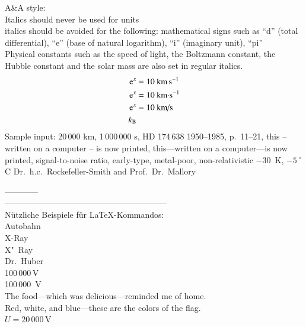A\&A style:\\
Italics should never be used for units\\
italics should be avoided for the following: mathematical signs such as ``d'' (total differential), ``e'' (base of natural logarithm), ``i'' (imaginary unit), ``pi''\\
Physical constants such as the speed of light, the Boltzmann constant, the Hubble constant and the solar mass are also set in regular italics.\\
\begin{align}
	\text{e}^x &= 10~\text{km\,s}^{-1}\\
	\text{e}^x &= 10~\text{km\textperiodcentered s}^{-1}\\
	\text{e}^x &= 10~\text{km/s}\\
	k_\text{B}
\end{align}
Sample input:
20\,000 km, 1\,000\,000 s, HD 174\,638 1950--1985, p.~11--21, this -- written on a computer -- is now printed, this---written on a computer---is now printed, signal-to-noise ratio, early-type, metal-poor, non-relativistic $-30$~K, $-5\ ^{\circ}$C Dr.~h.c.~Rockefeller-Smith and Prof.~Dr.~Mallory

------------\\

-----------------------------------------------------------\\
N\"utzliche Beispiele f\"ur LaTeX-Kommandos:\\
Autob\-ahn\\	%
X-Ray\\		%
X"~Ray\\	%
Dr.~Huber\\	%
100\,000\,V\\	%
100\,000~V\\	%
The food---which was delicious---reminded me of home.\\
Red, white, and blue---these are the colors of the flag.\\

$U = 20$\,$000$\,V	%

